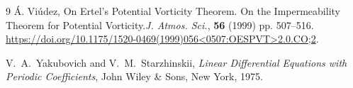 \documentclass[reqno]{amsart}
\begin{document}
\begin{thebibliography}{9}
Á. Viúdez, On Ertel's Potential Vorticity Theorem. On the Impermeability Theorem for Potential Vorticity.\textit{J. Atmos. Sci.}, \textbf{56} (1999) pp. 507--516.
\url{https://doi.org/10.1175/1520-0469(1999)056<0507:OESPVT>2.0.CO;2}.





V.~A.~Yakubovich and V.~M.~Starzhinskii,
\textit{Linear Differential Equations with Periodic Coefficients},
John Wiley \& Sons, New York, 1975.





\end{thebibliography}
\end{document}
